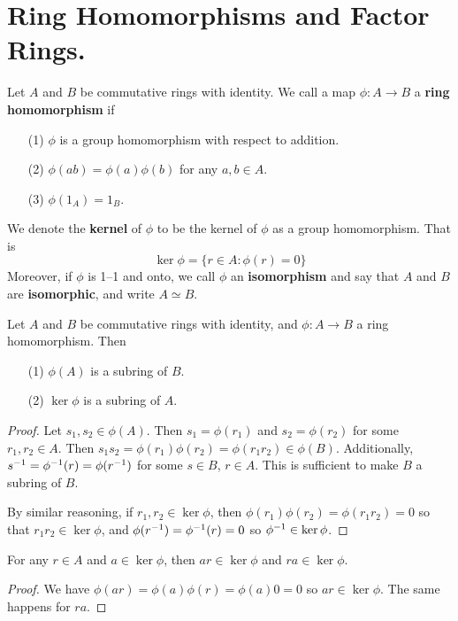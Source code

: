 \section{Ring Homomorphisms and Factor Rings.}

\begin{definition}
    Let $A$ and  $B$ be commutative rings with identity. We call a map
    $\phi:A \xrightarrow{} B$ a \textbf{ring homomorphism} if
    \begin{enumerate}
        \item[(1)] $\phi$ is a group homomorphism with respect to addition.

        \item[(2)] $\phi(ab)=\phi(a)\phi(b)$ for any $a,b \in A$.

        \item[(3)] $\phi(1_A)=1_B$.
    \end{enumerate}
    We denote the \textbf{kernel} of $\phi$ to be the kernel of $\phi$ as a
    group homomorphism. That is
    \begin{equation*}
        \ker{\phi}=\{r \in A : \phi(r)=0\}
    \end{equation*}
    Moreover, if $\phi$ is 1--1 and onto, we call $\phi$ an \textbf{isomorphism}
    and say that $A$ and $B$ are \textbf{isomorphic}, and write $A \simeq B$.
\end{definition}

\begin{lemma}\label{1.3.1}
    Let $A$ and $B$ be commutative rings with identity, and $\phi:A \xrightarrow{}
    B$ a ring homomorphism. Then
    \begin{enumerate}
        \item[(1)] $\phi(A)$ is a subring of $B$.

        \item[(2)] $\ker{\phi}$ is a subring of $A$.
    \end{enumerate}
\end{lemma}
\begin{proof}
    Let $s_1,s_2 \in \phi(A)$. Then $s_1=\phi(r_1)$ and $s_2=\phi(r_2)$ for some
    $r_1,r_2 \in A$. Then $s_1s_2=\phi(r_1)\phi(r_2)=\phi(r_1r_2) \in \phi(B)$.
    Additionally, $s^{-1}=\phi^{-1}(r)=\phi(r^{-1})$ for some $s \in B$,  $r
    \in A$. This is sufficient to make  $B$ a subring of  $B$.

    By similar reasoning, if $r_1,r_2 \in \ker{\phi}$, then
    $\phi(r_1)\phi(r_2)=\phi(r_1r_2)=0$ so that $r_1r_2 \in \ker{\phi}$, and
    $\phi(r^{-1})=\phi^{-1}(r)=0$ so $\phi^{-1}\in \ker{\phi}$.
\end{proof}
\begin{corollary}
    For any $r \in A$ and  $a \in \ker{\phi}$, then $ar \in \ker{\phi}$ and $ra
    \in \ker{\phi}$.
\end{corollary}
\begin{proof}
    We have $\phi(ar)=\phi(a)\phi(r)=\phi(a)0=0$ so $ar \in \ker{\phi}$. The
    same happens for $ra$.
\end{proof}

